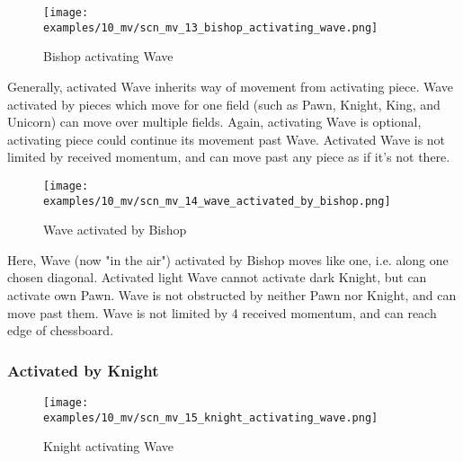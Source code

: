 \vspace*{-1.4\baselineskip}
\noindent
\begin{figure}[h]
\texttt{[image: examples/10\_mv/scn\_mv\_13\_bishop\_activating\_wave.png]}
\caption{Bishop activating Wave}
\label{fig:scn_mv_13_bishop_activating_wave}
\end{figure}

Generally, activated Wave inherits way of movement from activating piece. Wave activated
by pieces which move for one field (such as Pawn, Knight, King, and Unicorn) can move
over multiple fields. Again, activating Wave is optional, activating piece could continue
its movement past Wave. Activated Wave is not limited by received momentum, and can move
past any piece as if it's not there.

\clearpage %

\vspace*{-2.1\baselineskip}
\noindent
\begin{figure}[!h]
\texttt{[image: examples/10\_mv/scn\_mv\_14\_wave\_activated\_by\_bishop.png]}
\caption{Wave activated by Bishop}
\label{fig:scn_mv_14_wave_activated_by_bishop}
\end{figure}

Here, Wave (now "in the air") activated by Bishop moves like one, i.e. along one chosen
diagonal. Activated light Wave cannot activate dark Knight, but can activate own Pawn.
Wave is not obstructed by neither Pawn nor Knight, and can move past them. Wave is not
limited by 4 received momentum, and can reach edge of chessboard.

\clearpage %

\subsubsection*{Activated by Knight}
\label{sec:Miranda's veil/Wave/Movement/Activated by Knight}

\vspace*{-1.4\baselineskip}
\noindent
\begin{figure}[h]
\texttt{[image: examples/10\_mv/scn\_mv\_15\_knight\_activating\_wave.png]}
\caption{Knight activating Wave}
\label{fig:scn_mv_15_knight_activating_wave}
\end{figure}

